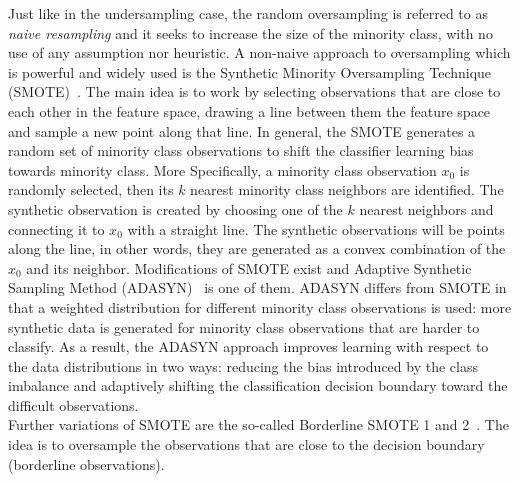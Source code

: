 Just like in the undersampling case, the random oversampling is referred to as {\em naive resampling} and it seeks to increase the size of the minority class, with no use of any assumption nor heuristic.
A non-naive approach to oversampling which is powerful and widely used is the 
Synthetic Minority Oversampling Technique (SMOTE)~\cite{chawla2002smote}. The main idea is to work by selecting observations that are close to each other in the feature space, drawing a line between them the feature space and  sample a new point along that line. In general, the SMOTE generates a random set of minority class observations to shift the classifier learning bias towards minority class.
More Specifically,  a minority class observation $x_{0}$  is randomly selected, then its  $k$ nearest minority class neighbors are identified. The synthetic observation is  created by choosing one of the $k$ nearest neighbors and connecting it to $x_{0}$ with a straight line. The synthetic observations will be points along the line, in other words, they are generated as a convex combination of the $x_{0}$ and its neighbor.
Modifications of SMOTE exist and Adaptive Synthetic Sampling Method (ADASYN)~\cite{he2008adasyn} is one of them. ADASYN  differs from SMOTE in that a   weighted distribution for different minority class observations is used:  more synthetic data is generated for minority class observations that are harder to classify.
 As a result, the ADASYN approach improves learning with respect to the data distributions in two ways:  reducing the bias introduced by the class imbalance and  adaptively shifting the classification decision boundary toward the difficult observations. \\
 \noindent
 Further variations of SMOTE are the so-called Borderline SMOTE 1 and 2~\cite{han2005borderline}. The idea is to oversample the observations that are  close to the decision boundary (borderline observations).





